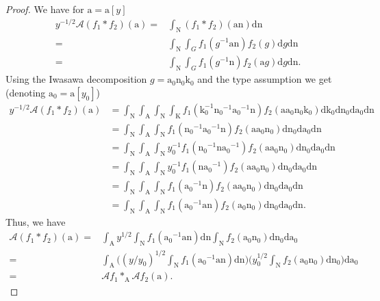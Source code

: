 \documentclass[12pt]{amsart}
\theoremstyle{definition}
\theoremstyle{remark}
\numberwithin{equation}{section}
\newcommand{\1}{{\mathbf 1}}
\renewcommand{\a}{\mathrm{a}}
\newcommand{\n}{\mathrm{n}}
\renewcommand{\k}{\mathrm{k}}
\renewcommand{\d}{\mathrm d}
\renewcommand{\n}{\mathrm{n}}
\begin{document}
\begin{proof}
    We have for $\mathrm{a}= \mathrm{a}[y]$
    \begin{align*}
  y^{-1/2}   \mathcal{A}(   f_1 \ast f_2 ) (\mathrm{a}) =& \int_\mathrm{N} ( f_1 \ast f_2)(\mathrm{a} \mathrm{n}) \d \mathrm{n} \\
    =&  \int_\mathrm{N} \int_G f_1(g^{-1} \mathrm{a} \mathrm{n}) f_2 ( g ) \d g \d \mathrm{n} \\
    =& \int_\mathrm{N} \int_G f_1(g^{-1}  \mathrm{n}) f_2 (\mathrm{a} g ) \d g \d \mathrm{n}. 
    \end{align*}
    Using the Iwasawa decomposition $g=\a_0 \n_0 \k_0$ and the type assumption we get (denoting $\a_0=\a[y_0]$)
    \begin{align*}
       y^{-1/2}   \mathcal{A}(   f_1 \ast f_2 ) (\mathrm{a})&=  \int_\mathrm{N} \int_\mathrm{A} \int_\mathrm{N}  \int_\mathrm{K}   f_1(\mathrm{k}_0^{-1 }\mathrm{n_0}^{-1} \mathrm{a_0}^{-1}  \mathrm{n}) f_2 (\mathrm{a} \mathrm{a_0} \mathrm{n_0} \mathrm{k}_0)\d \mathrm{k}_0 \d \mathrm{n}_0 \d \mathrm{a_0} 
 \d \mathrm{n} \\ &=   \int_\mathrm{N} \int_\mathrm{A} \int_\mathrm{N}  f_1(\mathrm{n_0}^{-1} \mathrm{a_0}^{-1}  \mathrm{n}) f_2 (\mathrm{a} \mathrm{a_0} \mathrm{n_0} ) \d \mathrm{n}_0 \d \mathrm{a_0} 
 \d \mathrm{n}  \\
 &=\int_\mathrm{N} \int_\mathrm{A} \int_\mathrm{N} y_0^{-1}  f_1( \mathrm{n_0}^{-1}  \mathrm{n}\mathrm{a_0}^{-1} ) f_2 (\mathrm{a} \mathrm{a_0} \mathrm{n_0} ) \d \mathrm{n}_0 \d \mathrm{a_0} 
 \d \mathrm{n} \\
 &=\int_\mathrm{N} \int_\mathrm{A} \int_\mathrm{N} y_0^{-1} f_1( \mathrm{n} \mathrm{a_0}^{-1} ) f_2 (\mathrm{a} \mathrm{a_0} \mathrm{n_0} ) \d \mathrm{n}_0 \d \mathrm{a_0}  \d \mathrm{n}\\
 &=\int_\mathrm{N} \int_\mathrm{A} \int_\mathrm{N} f_1( \mathrm{a_0}^{-1}\mathrm{n}  ) f_2 (\mathrm{a} \mathrm{a_0} \mathrm{n_0} ) \d \mathrm{n}_0 \d \mathrm{a_0}  \d \mathrm{n} \\
 &=\int_\mathrm{N} \int_\mathrm{A} \int_\mathrm{N}  f_1( \mathrm{a_0}^{-1} \mathrm{a}  \mathrm{n}) f_2 (\mathrm{a_0} \mathrm{n_0} ) \d \mathrm{n}_0 \d \mathrm{a_0}  \d \mathrm{n}.
    \end{align*}
Thus, we have
\begin{align*}
    \mathcal{A}(   f_1 \ast f_2 ) (\mathrm{a}) =  &\int_\mathrm{A} y^{1/2} \int_\mathrm{N}  f_1( \mathrm{a_0}^{-1} \mathrm{a}  \mathrm{n}) \d \mathrm{n} \int_\mathrm{N}   f_2 (\mathrm{a_0} \mathrm{n_0} ) \d \mathrm{n}_0 \d \mathrm{a_0} \\
    =&   \int_\mathrm{A} \bigg((y/y_0)^{1/2}\int_\mathrm{N}  f_1( \mathrm{a_0}^{-1} \mathrm{a}  \mathrm{n}) \d \mathrm{n} \bigg)  \bigg(y_0^{1/2}\int_\mathrm{N}   f_2 (\mathrm{a_0} \mathrm{n_0} ) \d \mathrm{n}_0 \bigg)\d \mathrm{a_0} \\
= & \mathcal{A} f_1 \ast_{\mathrm{A}} \mathcal{A} f_2 (\mathrm{a}).  
\end{align*}

\end{proof}
\end{document}
